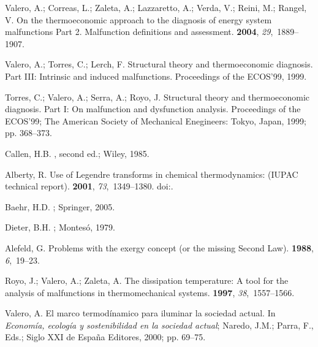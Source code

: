\documentclass[energies,article,submit,moreauthors,pdftex]{Definitions/mdpi}
\begin{document}
\begin{thebibliography}{99}
	Valero, A.; Correas, L.; Zaleta, A.; Lazzaretto, A.; Verda, V.; Reini, M.;
	Rangel, V.
	\newblock On the thermoeconomic approach to the diagnosis of energy system
	malfunctions Part 2. Malfunction definitions and assessment.
	 {\bf 2004}, {\em 29},~1889--1907.
	
	Valero, A.; Torres, C.; Lerch, F.
	\newblock Structural theory and thermoeconomic diagnosis. Part III: Intrinsic and induced malfunctions.
	\newblock  Proceedings of the ECOS'99,  1999.
	
	Torres, C.; Valero, A.; Serra, A.; Royo, J.
	\newblock Structural theory and thermoeconomic diagnosis. Part I: On
	malfunction and dysfunction analysis.
	\newblock  Proceedings of the ECOS'99; The American Society of Mechanical Enegineers: Tokyo, Japan,  1999; pp. 368--373.
	
	Callen, H.B.
	, second ed.; Wiley,  1985.
	
	Alberty, R.
	\newblock Use of Legendre transforms in chemical thermodynamics: (IUPAC technical report).
	 {\bf 2001}, {\em 73},~1349--1380.
	\newblock
	doi:{\href{https://doi.org/10.1351/pac200173081349}{}}.
	
	Baehr, H.D.
	; Springer, 2005.
	
	Dieter, B.H.
	; Montesó,  1979.
	
	Alefeld, G.
	\newblock Problems with the exergy concept (or the missing {S}econd {L}aw).
	 {\bf 1988}, {\em 6},~19--23.
	
	Royo, J.; Valero, A.; Zaleta, A.
	\newblock The dissipation temperature: A tool for the analysis of malfunctions in thermomechanical systems.
	 {\bf 1997}, {\em
	38},~1557--1566.
	
	Valero, A.
	\newblock El marco termodínamico para iluminar la sociedad actual. In {\em
		Economía, ecología y sostenibilidad en la sociedad actual}; Naredo, J.M.; Parra, F., Eds.; Siglo XXI de España Editores,  2000; pp. 69--75.	
\end{thebibliography}
\end{document}
